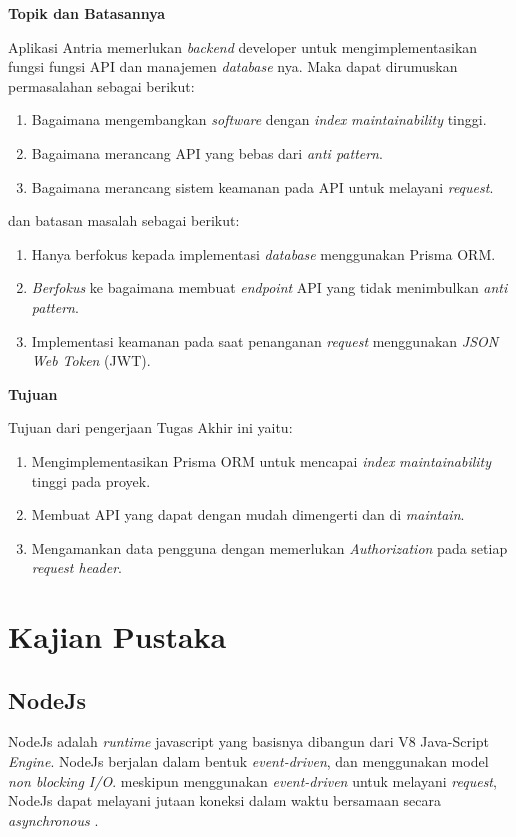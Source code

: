 \noindent\textbf{Topik dan Batasannya}

Aplikasi Antria memerlukan \textit{backend} developer untuk mengimplementasikan fungsi fungsi API dan manajemen \textit{database} nya. Maka dapat dirumuskan permasalahan sebagai berikut:
\begin{enumerate}
  \item Bagaimana mengembangkan \textit{software} dengan \textit{index} \textit{maintainability} tinggi.
  \item Bagaimana merancang API yang bebas dari \textit{anti pattern}.
  \item Bagaimana merancang sistem keamanan pada API untuk melayani \textit{request}.
\end{enumerate}
dan batasan masalah sebagai berikut:
\begin{enumerate}
  \item Hanya berfokus kepada implementasi \textit{database} menggunakan Prisma ORM.
  \item \textit{Berfokus} ke bagaimana membuat \textit{endpoint} API yang tidak menimbulkan \textit{anti pattern}.
  \item Implementasi keamanan pada saat penanganan \textit{request} menggunakan \textit{JSON Web Token} (JWT).
\end{enumerate}


\noindent\textbf{Tujuan}

Tujuan dari pengerjaan Tugas Akhir ini yaitu:
\begin{enumerate}
  \item Mengimplementasikan Prisma ORM untuk mencapai \textit{index} \textit{maintainability} tinggi pada proyek.
  \item Membuat API yang dapat dengan mudah dimengerti dan di \textit{maintain}.
  \item Mengamankan data pengguna dengan memerlukan \textit{Authorization} pada setiap \textit{request header}.
  
\end{enumerate}



\section{Kajian Pustaka}
\subsection{NodeJs}
NodeJs adalah \textit{runtime} javascript yang basisnya dibangun dari V8 Java-Script \textit{Engine}. NodeJs berjalan dalam bentuk \textit{event-driven}, dan menggunakan model \textit{non blocking I/O}. meskipun menggunakan \textit{event-driven} untuk melayani \textit{request}, NodeJs dapat melayani jutaan koneksi dalam waktu bersamaan secara \textit{asynchronous} \cite{shah2017node}.

